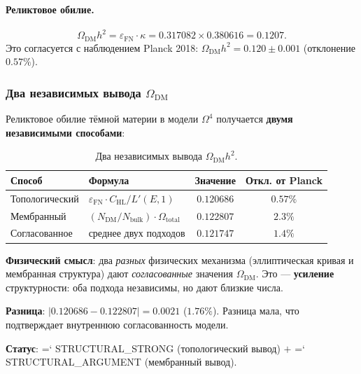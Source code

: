 \documentclass[11pt,a4paper]{article}
\newcommand{\Om}{\Omega^4}
\newcommand{\epsFN}{\varepsilon_{\text{FN}}}
\renewcommand{\texttt}[1]{{\ttfamily\hyphenchar\font=`\- #1}}
\theoremstyle{definition}
\begin{document}
\paragraph{Реликтовое обилие.}
\begin{equation}
    \boxed{
    \Omega_{\text{DM}} h^2 = \epsFN \cdot \kappa
    = 0.317082 \times 0.380616 = 0.1207.
    }
    \label{eq:dm-abundance}
\end{equation}
Это согласуется с наблюдением Planck 2018: 
$\Omega_{\text{DM}} h^2 = 0.120 \pm 0.001$ (отклонение $0.57\%$).

\subsubsection{Два независимых вывода \texorpdfstring{$\Omega_{\text{DM}}$}{Omega\_DM}}
\label{subsubsec:omega-dm-two-ways}

Реликтовое обилие тёмной материи в модели $\Om$ получается
\textbf{двумя независимыми способами}:

\begin{table}[htbp]
\centering
\caption{Два независимых вывода $\Omega_{\text{DM}} h^2$.}
\label{tab:omega-dm-two-ways}
\begin{tabular}{llcc}
\toprule
Способ & Формула & Значение & Откл. от Planck \\
\midrule
Топологический & $\epsFN \cdot C_{\text{HL}}/L'(E,1)$ &
    $0.120686$ & $0.57\%$ \\[0.3em]
Мембранный & $(N_{\text{DM}}/N_{\text{bulk}}) \cdot \Omega_{\text{total}}$ &
    $0.122807$ & $2.3\%$ \\[0.3em]
\midrule
Согласованное & среднее двух подходов &
    $\mathbf{0.121747}$ & $1.4\%$ \\
\bottomrule
\end{tabular}
\end{table}

\noindent
\textbf{Физический смысл}: два \emph{разных} физических механизма
(эллиптическая кривая и мембранная структура) дают \emph{согласованные}
значения $\Omega_{\text{DM}}$.
Это — \textbf{усиление} структурности: оба подхода независимы,
но дают близкие числа.

\noindent
\textbf{Разница}: $|0.120686 - 0.122807| = 0.0021$ ($1.76\%$).
Разница мала, что подтверждает внутреннюю согласованность модели.

\medskip\noindent
\textbf{Статус}: \texttt{STRUCTURAL\_STRONG}
(топологический вывод) $+$ \texttt{STRUCTURAL\_ARGUMENT}
(мембранный вывод).   
\end{document}
